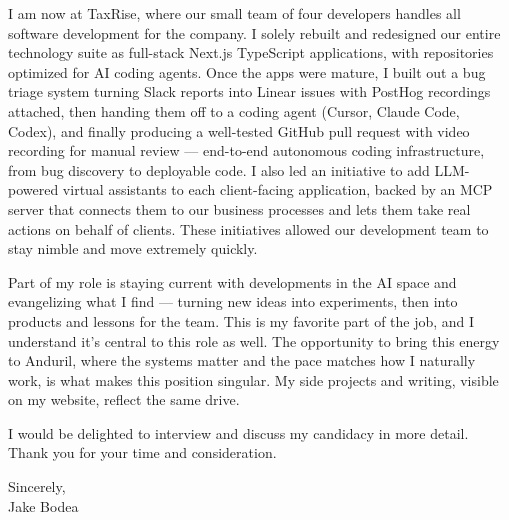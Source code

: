 \documentclass[
]{article}
\begin{document}
I am now at TaxRise, where our small team of four developers handles all
software development for the company. I solely rebuilt and redesigned
our entire technology suite as full-stack Next.js TypeScript
applications, with repositories optimized for AI coding agents. Once the
apps were mature, I built out a bug triage system turning Slack reports
into Linear issues with PostHog recordings attached, then handing them
off to a coding agent (Cursor, Claude Code, Codex), and finally
producing a well-tested GitHub pull request with video recording for
manual review --- end-to-end autonomous coding infrastructure, from bug
discovery to deployable code. I also led an initiative to add
LLM-powered virtual assistants to each client-facing application, backed
by an MCP server that connects them to our business processes and lets
them take real actions on behalf of clients. These initiatives allowed
our development team to stay nimble and move extremely quickly.

Part of my role is staying current with developments in the AI space and
evangelizing what I find --- turning new ideas into experiments, then
into products and lessons for the team. This is my favorite part of the
job, and I understand it's central to this role as well. The opportunity
to bring this energy to Anduril, where the systems matter and the pace
matches how I naturally work, is what makes this position singular. My
side projects and writing, visible on my website, reflect the same
drive.

I would be delighted to interview and discuss my candidacy in more
detail. Thank you for your time and consideration.

\vspace{\baselineskip}

Sincerely,\\
Jake Bodea
\end{document}
